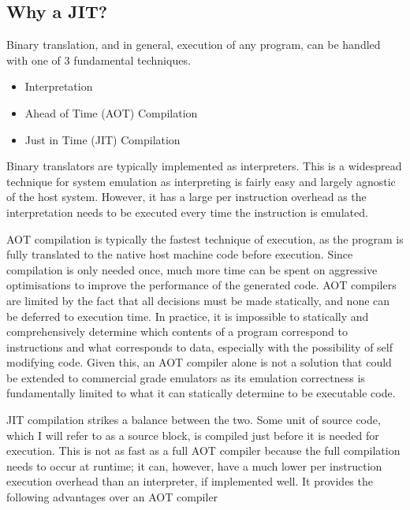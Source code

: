 \subsection{Why a JIT?}

Binary translation, and in general, execution of any program, can be handled with one of 3 fundamental techniques.

\begin{itemize}
    \item Interpretation
    \item Ahead of Time (AOT) Compilation
    \item Just in Time (JIT) Compilation
\end{itemize}

Binary translators are typically implemented as interpreters. This is a widespread technique for system emulation as interpreting is fairly easy and largely agnostic of the host system. However, it has a large per instruction overhead as the interpretation needs to be executed every time the instruction is emulated.

AOT compilation is typically the fastest technique of execution, as the program is fully translated to the native host machine code before execution. Since compilation is only needed once, much more time can be spent on aggressive optimisations to improve the performance of the generated code. AOT compilers are limited by the fact that all decisions must be made statically, and none can be deferred to execution time. In practice, it is impossible to statically and comprehensively determine which contents of a program correspond to instructions and what corresponds to data, especially with the possibility of self modifying code. Given this, an AOT compiler alone is not a solution that could be extended to commercial grade emulators as its emulation correctness is fundamentally limited to what it can statically determine to be executable code.

JIT compilation strikes a balance between the two. Some unit of source code, which I will refer to as a source block, is compiled just before it is needed for execution. This is not as fast as a full AOT compiler because the full compilation needs to occur at runtime; it can, however, have a much lower per instruction execution overhead than an interpreter, if implemented well. It provides the following advantages over an AOT compiler

